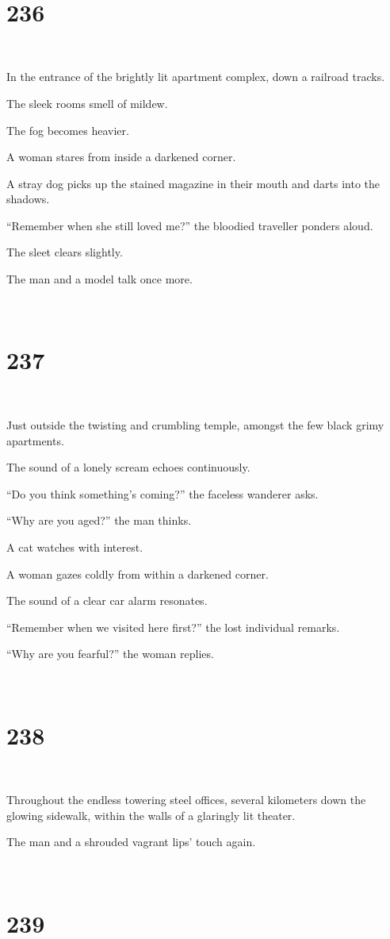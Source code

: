 \documentclass{report}
\begin{document}
~
\chapter*{236}
~

In the entrance of the brightly lit apartment complex, down a railroad tracks.

The sleek rooms smell of mildew.

The fog becomes heavier.

A woman stares from inside a darkened corner.

A stray dog picks up the stained magazine in their mouth and darts into the shadows.

``Remember when she still loved me?'' the bloodied traveller ponders aloud.

The sleet clears slightly.

The man and a model talk once more.

~
\chapter*{237}
~

Just outside the twisting and crumbling temple, amongst the few black grimy apartments.

The sound of a lonely scream echoes continuously.

``Do you think something's coming?'' the faceless wanderer asks.

``Why are you aged?'' the man thinks.

A cat watches with interest.

A woman gazes coldly from within a darkened corner.

The sound of a clear car alarm resonates.

``Remember when we visited here first?'' the lost individual remarks.

``Why are you fearful?'' the woman replies.

~
\chapter*{238}
~

Throughout the endless towering steel offices, several kilometers down the glowing sidewalk, within the walls of a glaringly lit theater.

The man and a shrouded vagrant lips' touch again.

~
\chapter*{239}
~
\end{document}
